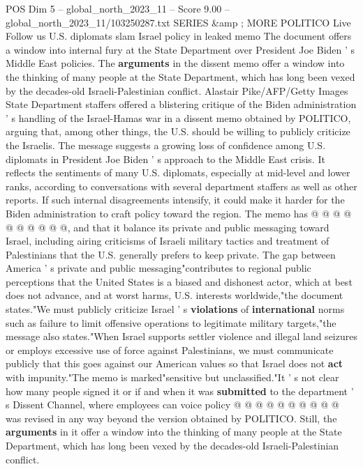 \begin{textsample}{POS Dim 5 – global\_north\_2023\_11 – Score 9.00 – global\_north\_2023\_11/103250287.txt}  \label{ex:f5_pos_416}
SERIES \&amp ; MORE POLITICO Live Follow us U.S. diplomats slam Israel policy in leaked memo The document offers a window into internal fury at the State Department over President Joe Biden ' s Middle East policies.
The \textbf{arguments} in the dissent memo offer a window into the thinking of many people at the State Department, which has long been vexed by the decades-old Israeli-Palestinian conflict.
Alastair Pike/AFP/Getty Images State Department staffers offered a blistering critique of the Biden administration ' s handling of the Israel-Hamas war in a dissent memo obtained by POLITICO, arguing that, among other things, the U.S. should be willing to publicly criticize the Israelis.
The message suggests a growing loss of confidence among U.S. diplomats in President Joe Biden ' s approach to the Middle East crisis.
It reflects the sentiments of many U.S. diplomats, especially at mid-level and lower ranks, according to conversations with several department staffers as well as other reports.
If such internal disagreements intensify, it could make it harder for the Biden administration to craft policy toward the region.
The memo has @ @ @ @ @ @ @ @ @ @, and that it balance its private and public messaging toward Israel, including airing criticisms of Israeli military tactics and treatment of Palestinians that the U.S. generally prefers to keep private.
The gap between America ' s private and public messaging"contributes to regional public perceptions that the United States is a biased and dishonest actor, which at best does not advance, and at worst harms, U.S. interests worldwide,"the document states."We must publicly criticize Israel ' s \textbf{violations} of \textbf{international} norms such as failure to limit offensive operations to legitimate military targets,"the message also states."When Israel supports settler violence and illegal land seizures or employs excessive use of force against Palestinians, we must communicate publicly that this goes against our American values so that Israel does not \textbf{act} with impunity."The memo is marked"sensitive but unclassified."It ' s not clear how many people signed it or if and when it was \textbf{submitted} to the department ' s Dissent Channel, where employees can voice policy @ @ @ @ @ @ @ @ @ @ was revised in any way beyond the version obtained by POLITICO.
Still, the \textbf{arguments} in it offer a window into the thinking of many people at the State Department, which has long been vexed by the decades-old Israeli-Palestinian conflict.

\end{textsample}
